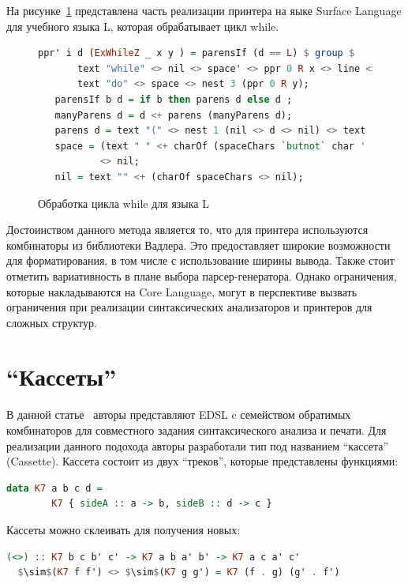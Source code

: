 На рисунке~\ref{LFliPpr} представлена часть реализации принтера на яыке Surface Language для учебного 
языка L, которая обрабатывает цикл while.

\begin{figure}[ht]
\centering
\begin{lstlisting}[language=Haskell]
   ppr' i d (ExWhileZ _ x y ) = parensIf (d == L) $ group $ 
       text "while" <> nil <> space' <> ppr 0 R x <> line <> 
       text "do" <> space <> nest 3 (ppr 0 R y);                                                
   parensIf b d = if b then parens d else d ;
   manyParens d = d <+ parens (manyParens d);
   parens d = text "(" <> nest 1 (nil <> d <> nil) <> text ")";
   space = (text " " <+ charOf (spaceChars `butnot` char ' ')) 
           <> nil;
   nil = text "" <+ (charOf spaceChars <> nil);
\end{lstlisting}
\caption{Обработка цикла while для языка L}
\label{LFliPpr}
\end{figure}

Достоинством данного метода является то, что для принтера используются комбинаторы из библиотеки Вадлера. 
Это предоставляет широкие возможности для форматирования, в том числе с использование ширины вывода. 
Также стоит отметить вариативность в плане выбора парсер-генератора. Однако ограничения, которые
накладываются на Core Language, могут в перспективе вызвать ограничения при реализации 
синтаксических анализаторов и принтеров для сложных структур.

\section{``Кассеты''}

В данной статье~\cite{Boespflug} авторы представляют EDSL c семейством обратимых комбинаторов для совместного 
задания синтаксического анализа и печати. Для реализации данного подохода авторы разработали 
тип под названием ``кассета'' (Cassette). Кассета состоит из двух ``треков'', которые представлены функциями:

\begin{lstlisting}[mathescape,language=Haskell]
   data K7 a b c d = 
        K7 { sideA :: a -> b, sideB :: d -> c }
\end{lstlisting}

Кассеты можно склеивать для получения новых:

\begin{lstlisting}[mathescape,language=Haskell]
  (<>) :: K7 b c b' c' -> K7 a b a' b' -> K7 a c a' c'
  $\sim$(K7 f f') <> $\sim$(K7 g g') = K7 (f . g) (g' . f')
\end{lstlisting}


